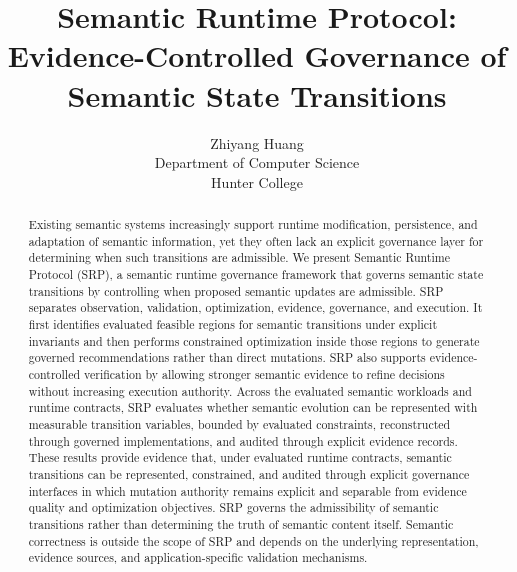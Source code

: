 ﻿\documentclass[10pt]{article}
\title{Semantic Runtime Protocol: Evidence-Controlled Governance of Semantic State Transitions}
\author{Zhiyang Huang\\Department of Computer Science\\Hunter College}
\date{}
\newcommand{\SRPBody}{}%
\newcommand{\SRPBody}{%
    \section*{Packaging Note}
    This arXiv package skeleton is intentionally thin. The manuscript body is imported from the canonical source \texttt{fixed.md} during the packaging conversion step.

    \medskip
    The package includes figure assets, a bibliography file, and an appendix shell so the submission bundle has a clear structure without duplicating the manuscript source.
  }%
\begin{document}
\setlength{\emergencystretch}{2em}
\maketitle
\setcounter{secnumdepth}{2}

\begin{abstract}
Existing semantic systems increasingly support runtime modification, persistence, and adaptation of semantic information, yet they often lack an explicit governance layer for determining when such transitions are admissible. We present Semantic Runtime Protocol (SRP), a semantic runtime governance framework that governs semantic state transitions by controlling when proposed semantic updates are admissible. SRP separates observation, validation, optimization, evidence, governance, and execution. It first identifies evaluated feasible regions for semantic transitions under explicit invariants and then performs constrained optimization inside those regions to generate governed recommendations rather than direct mutations. SRP also supports evidence-controlled verification by allowing stronger semantic evidence to refine decisions without increasing execution authority. Across the evaluated semantic workloads and runtime contracts, SRP evaluates whether semantic evolution can be represented with measurable transition variables, bounded by evaluated constraints, reconstructed through governed implementations, and audited through explicit evidence records. These results provide evidence that, under evaluated runtime contracts, semantic transitions can be represented, constrained, and audited through explicit governance interfaces in which mutation authority remains explicit and separable from evidence quality and optimization objectives. SRP governs the admissibility of semantic transitions rather than determining the truth of semantic content itself. Semantic correctness is outside the scope of SRP and depends on the underlying representation, evidence sources, and application-specific validation mechanisms.
\end{abstract}

\SRPBody


\end{document}
